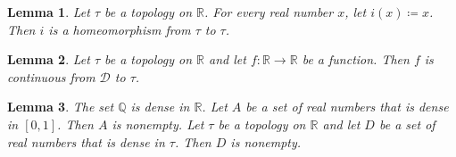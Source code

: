 \documentclass{article}
\newtheorem{lemma}{Lemma}
\begin{document}
\begin{lemma}\label{identity}
Let $\tau$ be a topology on $\mathbb{R}$. For every real number $x$, let $i(x)\coloneqq x$. Then $i$ is a homeomorphism from $\tau$ to $\tau$.
\end{lemma}

\begin{lemma}\label{continuous}
Let $\tau$ be a topology on $\mathbb{R}$ and let $f:\mathbb{R}\to\mathbb{R}$ be a function. Then $f$ is continuous from $\mathcal{D}$ to $\tau$.
\end{lemma}

\begin{lemma}\label{dense-in-sets}
The set $\mathbb{Q}$ is dense in $\mathbb{R}$. Let $A$ be a set of real numbers that is dense in $[0,1]$. Then $A$ is nonempty. Let $\tau$ be a topology on $\mathbb{R}$ and let $D$ be a set of real numbers that is dense in $\tau$. Then $D$ is nonempty.
\end{lemma}
\end{document}
